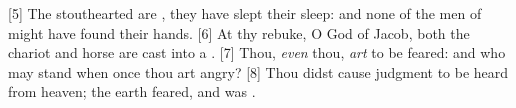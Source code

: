 [5] \textcolor[cmyk]{0.99998,1,0,0}{The stouthearted are , they have slept their sleep: and none of the men of might have found their hands.} %
[6] \textcolor[cmyk]{0.99998,1,0,0}{At thy rebuke, O God of Jacob, both the chariot and horse are cast into a .} %
[7] \textcolor[cmyk]{0.99998,1,0,0}{Thou, \emph{even} thou, \emph{art} to be feared: and who may stand  when once thou art angry?}
[8] \textcolor[cmyk]{0.99998,1,0,0}{Thou didst cause judgment to be heard from heaven; the earth feared, and was .}
